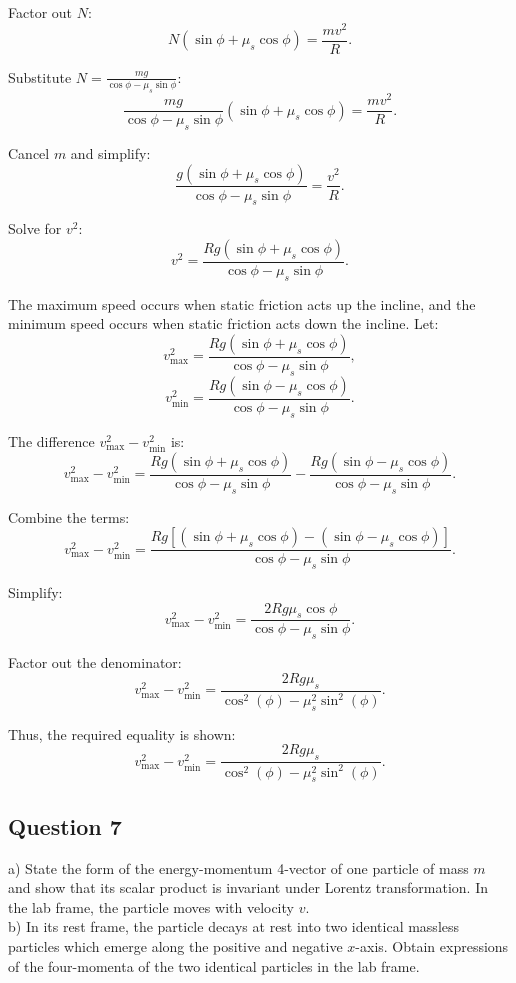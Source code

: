 \documentclass{article}
\begin{document}
Factor out $N$:
\[
N (\sin\phi + \mu_s \cos\phi) = \frac{mv^2}{R}.
\]

Substitute $N = \frac{mg}{\cos\phi - \mu_s \sin\phi}$:
\[
\frac{mg}{\cos\phi - \mu_s \sin\phi} (\sin\phi + \mu_s \cos\phi) = \frac{mv^2}{R}.
\]

Cancel $m$ and simplify:
\[
\frac{g (\sin\phi + \mu_s \cos\phi)}{\cos\phi - \mu_s \sin\phi} = \frac{v^2}{R}.
\]

Solve for $v^2$:
\[
v^2 = \frac{Rg (\sin\phi + \mu_s \cos\phi)}{\cos\phi - \mu_s \sin\phi}.
\]

The maximum speed occurs when static friction acts up the incline, and the minimum speed occurs when static friction acts down the incline. Let:
\[
v_{\text{max}}^2 = \frac{Rg (\sin\phi + \mu_s \cos\phi)}{\cos\phi - \mu_s \sin\phi},
\]
\[
v_{\text{min}}^2 = \frac{Rg (\sin\phi - \mu_s \cos\phi)}{\cos\phi - \mu_s \sin\phi}.
\]

The difference $v_{\text{max}}^2 - v_{\text{min}}^2$ is:
\[
v_{\text{max}}^2 - v_{\text{min}}^2 = \frac{Rg (\sin\phi + \mu_s \cos\phi)}{\cos\phi - \mu_s \sin\phi} - \frac{Rg (\sin\phi - \mu_s \cos\phi)}{\cos\phi - \mu_s \sin\phi}.
\]

Combine the terms:
\[
v_{\text{max}}^2 - v_{\text{min}}^2 = \frac{Rg [(\sin\phi + \mu_s \cos\phi) - (\sin\phi - \mu_s \cos\phi)]}{\cos\phi - \mu_s \sin\phi}.
\]

Simplify:
\[
v_{\text{max}}^2 - v_{\text{min}}^2 = \frac{2Rg \mu_s \cos\phi}{\cos\phi - \mu_s \sin\phi}.
\]

Factor out the denominator:
\[
v_{\text{max}}^2 - v_{\text{min}}^2 = \frac{2Rg\mu_s}{\cos^2(\phi) - \mu_s^2\sin^2(\phi)}.
\]

Thus, the required equality is shown:
\[
\boxed{v_{\text{max}}^2 - v_{\text{min}}^2 = \frac{2Rg\mu_s}{\cos^2(\phi) - \mu_s^2\sin^2(\phi)}}.
\]

\subsection{Question 7}

a) State the form of the energy-momentum 4-vector of one particle of mass \(m\) and show that its scalar product is invariant under Lorentz transformation. In the lab frame, the particle moves with velocity \(v\). \\ 

b) In its rest frame, the particle decays at rest into two identical massless particles which emerge along the positive and negative \(x\)-axis. Obtain expressions of the four-momenta of the two identical particles in the lab frame. \\ 
\end{document}
